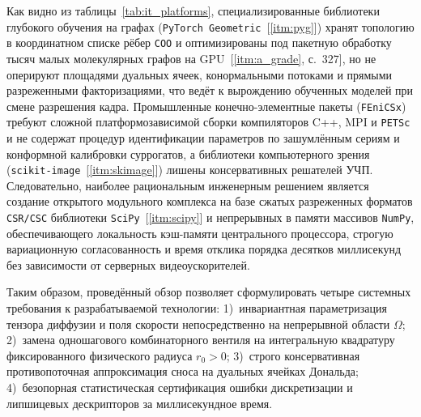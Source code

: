 Как видно из таблицы~\ref{tab:it_platforms}, специализированные библиотеки глубокого обучения на графах (\texttt{PyTorch Geometric}~[\ref{itm:pyg}]) хранят топологию в координатном списке рёбер \texttt{COO} и оптимизированы под пакетную обработку тысяч малых молекулярных графов на GPU~[\ref{itm:a_grade}, с.~327], но не оперируют площадями дуальных ячеек, конормальными потоками и прямыми разреженными факторизациями, что ведёт к вырождению обученных моделей при смене разрешения кадра. Промышленные конечно-элементные пакеты (\texttt{FEniCSx}) требуют сложной платформозависимой сборки компиляторов C++, MPI и \texttt{PETSc} и не содержат процедур идентификации параметров по зашумлённым сериям и конформной калибровки суррогатов, а библиотеки компьютерного зрения (\texttt{scikit-image}~[\ref{itm:skimage}]) лишены консервативных решателей УЧП. Следовательно, наиболее рациональным инженерным решением является создание открытого модульного комплекса на базе сжатых разреженных форматов \texttt{CSR/CSC} библиотеки \texttt{SciPy}~[\ref{itm:scipy}] и непрерывных в памяти массивов \texttt{NumPy}, обеспечивающего локальность кэш-памяти центрального процессора, строгую вариационную согласованность и время отклика порядка десятков миллисекунд без зависимости от серверных видеоускорителей.

Таким образом, проведённый обзор позволяет сформулировать четыре системных требования к разрабатываемой технологии: 1)~инвариантная параметризация тензора диффузии и поля скорости непосредственно на непрерывной области $\Omega$; 2)~замена одношагового комбинаторного вентиля на интегральную квадратуру фиксированного физического радиуса $r_0>0$; 3)~строго консервативная противопоточная аппроксимация сноса на дуальных ячейках Дональда; 4)~безопорная статистическая сертификация ошибки дискретизации и липшицевых дескрипторов за миллисекундное время.

\newpage
